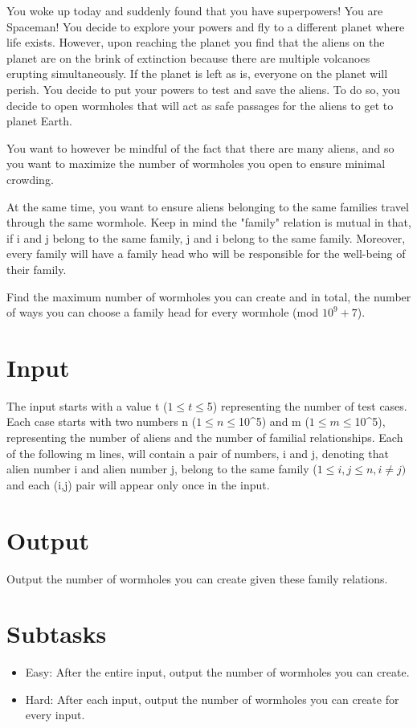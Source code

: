 
You woke up today and suddenly found that you have superpowers! You are Spaceman! You decide to explore your powers and fly to a different planet where life exists. However, upon reaching the planet you find that the aliens on the planet are on the brink of extinction because there are multiple volcanoes erupting simultaneously. If the planet is left as is, everyone on the planet will perish. You decide to put your powers to test and save the aliens. To do so, you decide to open wormholes that will act as safe passages for the aliens to get to planet Earth.

You want to however be mindful of the fact that there are many aliens, and so you want to maximize the number of wormholes you open to ensure minimal crowding. 

At the same time, you want to ensure aliens belonging to the same families travel through the same wormhole. Keep in mind the "family" relation is mutual in that, if i and j belong to the same family, j and i belong to the same family. Moreover, every family will have a family head who will be responsible for the well-being of their family. 

Find the maximum number of wormholes you can create and in total, the number of ways you can choose a family head for every wormhole (mod $10^{9}+7$).\newline

\section*{Input}
 \indent The input starts with a value t ($1 \le t \le $5) representing the number of test cases. 
  Each case starts with two numbers n ($1 \le n \le $10^{5}) and m ($1 \le m \le $10^{5}), representing the number of aliens and the number of familial relationships. Each of the following m lines, will contain a pair of numbers, i and j, denoting that alien number i and alien number j, belong to the same family ($1 \le i,j \le n, i \neq j)$ and each (i,j) pair will appear only once in the input.

\section*{Output}
Output the number of wormholes you can create given these family relations.

\section*{Subtasks}
\begin{itemize}
	 \item Easy: After the entire input, output the number of wormholes you can create.
    	 \item Hard: After each input, output the number of wormholes you can create for every input.
\end{itemize}
